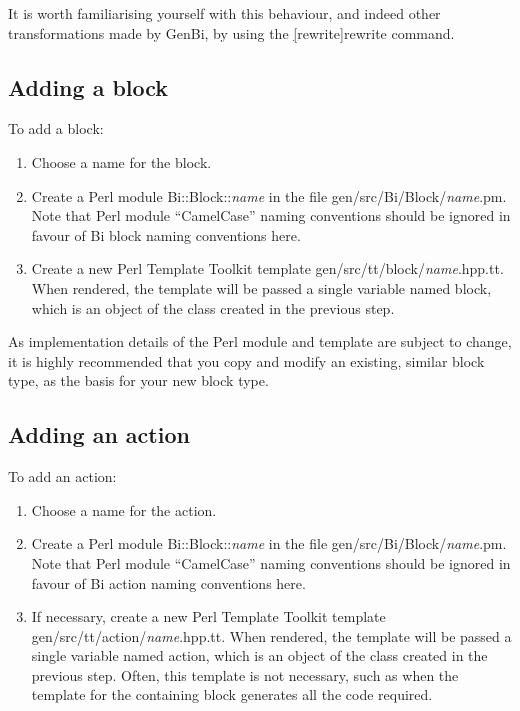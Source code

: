 It is worth familiarising yourself with this behaviour, and indeed other
transformations made by GenBi, by using the
\hyperref[hyper][rewrite]{\sf rewrite} command.

\subsection{Adding a block}

To add a block:
\begin{enumerate}
\item Choose a name for the block.
\item Create a Perl module \textsf{Bi::Block::\textit{name}} in the
  file \textsf{gen/src/Bi/Block/\textit{name}.pm}. Note that Perl module
  ``CamelCase'' naming conventions should be ignored in favour of Bi block
  naming conventions here.
\item Create a new Perl Template Toolkit template
  \textsf{gen/src/tt/block/\textit{name}.hpp.tt}. When rendered, the template
  will be passed a single variable named \textsf{block}, which is an object of
  the class created in the previous step.
\end{enumerate}

As implementation details of the Perl module and template are subject to
change, it is highly recommended that you copy and modify an existing, similar
block type, as the basis for your new block type.

\subsection{Adding an action}

To add an action:
\begin{enumerate}
\item Choose a name for the action.
\item Create a Perl module \textsf{Bi::Block::\textit{name}} in the
  file \textsf{gen/src/Bi/Block/\textit{name}.pm}. Note that Perl module
  ``CamelCase'' naming conventions should be ignored in favour of Bi action
  naming conventions here.
\item If necessary, create a new Perl Template Toolkit template
  \textsf{gen/src/tt/action/\textit{name}.hpp.tt}. When rendered, the template
  will be passed a single variable named \textsf{action}, which is an object
  of the class created in the previous step. Often, this template is not
  necessary, such as when the template for the containing block generates all
  the code required.
\end{enumerate}

